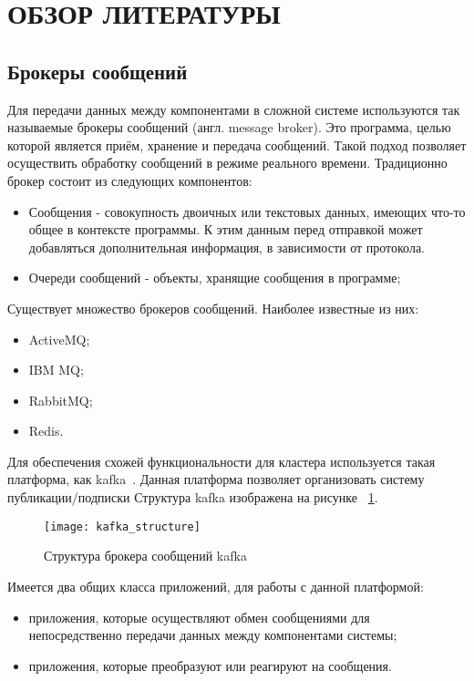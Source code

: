 \section{ОБЗОР ЛИТЕРАТУРЫ}
\label{sec:domain}

\subsection{Брокеры сообщений}

Для передачи данных между компонентами в сложной системе используются так называемые брокеры сообщений (англ. message broker).
Это программа, целью которой является приём, хранение и передача сообщений.
Такой подход позволяет осуществить обработку сообщений в режиме реального времени.
Традиционно брокер состоит из следующих компонентов:
\begin{itemize}
    \item Сообщения - совокупность двоичных или текстовых данных, имеющих что-то общее в контексте программы.
     К этим данным перед отправкой может добавляться дополнительная информация, в зависимости от протокола.
    \item Очереди сообщений - объекты, хранящие сообщения в программе;
\end{itemize}

Существует множество брокеров сообщений. Наиболее известные из них:
\begin{itemize}
    \item ActiveMQ;
    \item IBM MQ;
    \item RabbitMQ;
    \item Redis.
\end{itemize}

Для обеспечения схожей функциональности для кластера используется такая платформа, как kafka~\cite{kafka_documentation_intro}.
Данная платформа позволяет организовать систему публикации/подписки
Структура kafka изображена на рисунке ~\ref{pic:lit_review:kafka_structure}.

\begin{figure}
    \centering
    \texttt{[image: kafka\_structure]}
    \caption{Структура брокера сообщений kafka}
    \label{pic:lit_review:kafka_structure}
\end{figure}

Имеется два общих класса приложений, для работы с данной платформой:
\begin{itemize}
    \item приложения, которые осуществляют обмен сообщениями для непосредственно передачи данных между компонентами системы;
    \item приложения, которые преобразуют или реагируют на сообщения.
\end{itemize}

